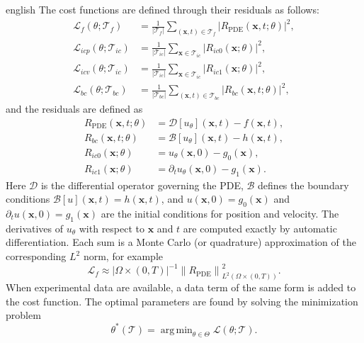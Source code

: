 \documentclass[12pt,letterpaper,twoside]{book}
\newcommand{\norm}[1]{\left\lVert #1 \right\rVert}
\newcommand{\abs}[1]{\left\lvert #1 \right\rvert}
\newcommand{\Loss}{\mathcal{L}}
\newcommand{\T}{\mathcal{T}}
\DeclareMathOperator*{\argmin}{arg\,min}
\begin{document}
\begin{hyphenrules}{english}
The cost functions are defined through their residuals as follows:
\begin{align}
  \Loss_f(\theta;\T_f)&=\frac{1}{\abs{\T_f}}\sum_{(\mathbf{x},t)\in\T_f}\abs{R_{\mathrm{PDE}}(\mathbf{x},t;\theta)}^2,\label{eq:loss-f}\\
  \Loss_{icp}(\theta;\T_{ic})&=\frac{1}{\abs{\T_{ic}}}\sum_{\mathbf{x}\in\T_{ic}}\abs{R_{ic0}(\mathbf{x};\theta)}^2,\label{eq:loss-icp}\\
  \Loss_{icv}(\theta;\T_{ic})&=\frac{1}{\abs{\T_{ic}}}\sum_{\mathbf{x}\in\T_{ic}}\abs{R_{ic1}(\mathbf{x};\theta)}^2,\label{eq:loss-icv}\\
  \Loss_{bc}(\theta;\T_{bc})&=\frac{1}{\abs{\T_{bc}}}\sum_{(\mathbf{x},t)\in\T_{bc}}\abs{R_{bc}(\mathbf{x},t;\theta)}^2,\label{eq:loss-bc}
\end{align}
and the residuals are defined as
\begin{align}
  R_{\mathrm{PDE}}(\mathbf{x},t;\theta)&=\mathcal{D}[u_\theta](\mathbf{x},t)-f(\mathbf{x},t), \label{eq:res-pde}\\
  R_{bc}(\mathbf{x},t;\theta)&=\mathcal{B}[u_\theta](\mathbf{x},t)-h(\mathbf{x},t), \label{eq:res-bc}\\
  R_{ic0}(\mathbf{x};\theta)&=u_\theta(\mathbf{x},0)-g_0(\mathbf{x}), \label{eq:res-ic0}\\
  R_{ic1}(\mathbf{x};\theta)&=\partial_t u_\theta(\mathbf{x},0)-g_1(\mathbf{x}). \label{eq:res-ic1}
\end{align}
Here $\mathcal{D}$ is the differential operator governing the PDE, $\mathcal{B}$ defines the boundary
conditions $\mathcal{B}[u](\mathbf{x},t)=h(\mathbf{x},t)$, and $u(\mathbf{x},0)=g_0(\mathbf{x})$ and $\partial_t u(\mathbf{x},0)=g_1(\mathbf{x})$ are the
initial conditions for position and velocity. The derivatives of $u_\theta$ with respect to $\mathbf{x}$ and $t$
are computed exactly by automatic differentiation. Each sum is a Monte Carlo (or quadrature)
approximation of the corresponding $L^2$ norm, for example
\[
  \Loss_f\approx\abs{\Omega\times(0,T)}^{-1}\norm{R_{\mathrm{PDE}}}_{L^2(\Omega\times(0,T))}^2.
\]
When
experimental data are available, a data term of the same form is added to the cost function. The optimal
parameters are found by solving the minimization problem
\begin{equation}
  \theta^{*}(\T)=\argmin_{\theta\in\Theta}\Loss(\theta;\T).
  \label{eq:pinn-argmin}
\end{equation}


\end{hyphenrules}
\end{document}
